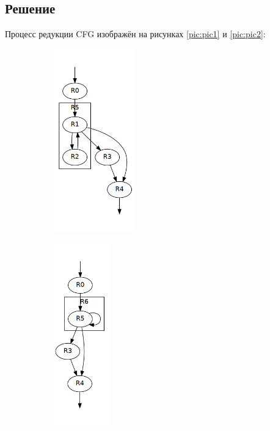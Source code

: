 \documentclass[11pt]{article}
\begin{document}
\subsection{Решение}
\label{sec:org5113069}
Процесс редукции CFG изображён на рисунках \ref{pic:pic1} и \ref{pic:pic2}:
\begin{figure}[h]
\caption{Редукция CFG, шаг 1}
\label{pic:pic1}
\begin{subfigure}{0.5\textwidth}
\includegraphics[height=300px]{regions1.png}

\end{subfigure}
\begin{subfigure}{0.5\textwidth}

\includegraphics[height=300px]{regions2.png}

\end{subfigure}
\end{figure}
\pagebreak
\end{document}
